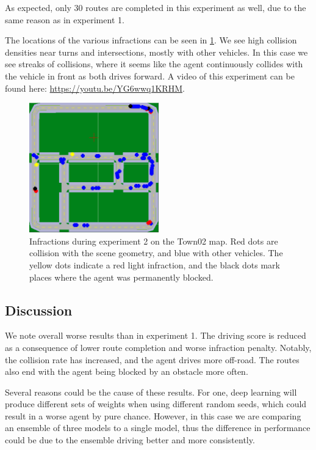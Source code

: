 As expected, only 30 routes are completed in this experiment as well, due to the same reason as in experiment 1.

The locations of the various infractions can be seen in \cref{fig:exp2:town02}.
We see high collision densities near turns and intersections,
mostly with other vehicles.
In this case we see streaks of collisions,
where it seems like the agent continuously collides
with the vehicle in front as both drives forward. 
A video of this experiment can be found here: \url{https://youtu.be/YG6wwq1KRHM}.

\begin{figure}
    \centering
    \includegraphics[width=0.5\textwidth]{chapters/4-experiments-results/figures/exp2-Town02.png}
    \caption{Infractions during experiment 2 on the Town02 map.
    Red dots are collision with the scene geometry,
    and blue with other vehicles.
    The yellow dots indicate a red light infraction,
    and the black dots mark places where the agent was permanently blocked.}
    \label{fig:exp2:town02}
\end{figure}


\subsection{Discussion}

We note overall worse results than in experiment 1.
The driving score is reduced as a consequence of lower route completion and worse infraction penalty.
Notably, the collision rate has increased,
and the agent drives more off-road.
The routes also end with the agent being blocked by an obstacle more often. 

Several reasons could be the cause of these results.
For one, deep learning will produce different sets of weights when using different random seeds,
which could result in a worse agent by pure chance.
However, in this case we are comparing an ensemble of three models to a single model,
thus the difference in performance could be due to the ensemble driving better and more consistently.

